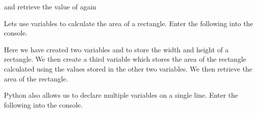 \documentclass[letterpaper,10pt,english]{jupyterBook}
\begin{document}
\sphinxAtStartPar
and retrieve the value of  again

\begin{sphinxVerbatim}[commandchars=\\\{\}]
 \PYG{p}{[}\PYG{p}{]} 
\PYG{p}{[}\PYG{p}{]} 
\end{sphinxVerbatim}

\sphinxAtStartPar
Lets use variables to calculate the area of a rectangle. Enter the following into the console.

\begin{sphinxVerbatim}[commandchars=\\\{\}]
 \PYG{p}{[}\PYG{p}{]}   

 \PYG{p}{[}\PYG{p}{]}   

 \PYG{p}{[}\PYG{p}{]}     

 \PYG{p}{[}\PYG{p}{]} 
\PYG{p}{[}\PYG{p}{]} 
\end{sphinxVerbatim}

\sphinxAtStartPar
Here we have created two variables  and  to store the width and height of a rectangle. We then create a third variable  which stores the area of the rectangle calculated using the values stored in the other two variables. We then retrieve the area of the rectangle.

\sphinxAtStartPar
Python also allows us to declare multiple variables on a single line. Enter the following into the console.

\begin{sphinxVerbatim}[commandchars=\\\{\}]
 \PYG{p}{[}\PYG{p}{]}     

 \PYG{p}{[}\PYG{p}{]}       

 \PYG{p}{[}\PYG{p}{]} 
\PYG{p}{[}\PYG{p}{]} 
\end{sphinxVerbatim}
\end{document}
